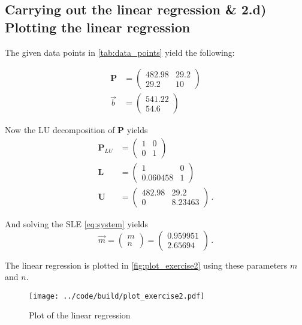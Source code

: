 \setcounter{subsection}{2}
\subsection{Carrying out the linear regression \& 2.d) Plotting the linear regression}

The given data points in \autoref{tab:data_points} yield the following:

\begin{align*}
    \symbf{P} &=
    \begin{pmatrix}
        482.98 & 29.2 \\
        29.2 & 10
    \end{pmatrix}\\
    \vec{b} &=
    \begin{pmatrix}
        541.22 \\
        54.6
    \end{pmatrix}
\end{align*}

Now the LU decomposition of $\symbf{P}$ yields
\begin{align*}
    \symbf{P}_{LU} &=
    \begin{pmatrix}
        1 & 0 \\
        0 & 1
    \end{pmatrix} \\
    \symbf{L} &=
    \begin{pmatrix}
        1 & 0 \\
        0.060458 & 1
    \end{pmatrix} \\
    \symbf{U} &=
    \begin{pmatrix}
        482.98 & 29.2 \\
        0 & 8.23463
    \end{pmatrix} \, .
\end{align*}

And solving the SLE \autoref{eq:system} yields
\begin{equation}
    \vec{m} = 
    \begin{pmatrix}
        m \\ 
        n
    \end{pmatrix}
    =
    \begin{pmatrix}
        0.959951 \\ 
        2.65694
    \end{pmatrix} \, .
\end{equation}

The linear regression is plotted in \autoref{fig:plot_exercise2} using these parameters $m$ and $n$.

\begin{figure}[h]
    \centering
    \texttt{[image: ../code/build/plot\_exercise2.pdf]}
    \caption{Plot of the linear regression}
    \label{fig:plot_exercise2}
\end{figure}